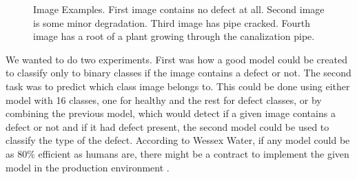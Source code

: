 \documentclass[thesis=B,english]{FITthesis}[2019/12/23]
\begin{document}
\begin{figure}

\caption[Image examples]{Image Examples. First image contains no defect at all. Second image is some minor degradation. Third image has pipe cracked. Fourth image has a root of a plant growing through the canalization pipe. }\label{fig:e}
\end{figure}


We wanted to do two experiments. First was how a good model could be created to classify only to binary classes if the image contains a defect or not. The second task was to predict which class image belongs to. This could be done using either model with 16 classes, one for healthy and the rest for defect classes, or by combining the previous model, which would detect if a given image contains a defect or not and if it had defect present, the second model could be used to classify the type of the defect. According to Wessex Water, if any model could be as 80\% efficient as humans are, there might be a contract to implement the given model in the production environment \cite{wessex_challenge}.
\end{document}
